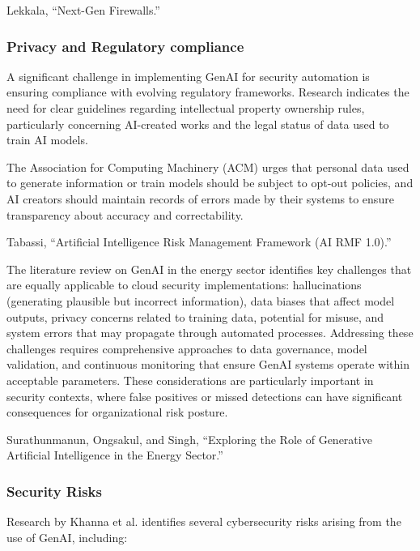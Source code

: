 Lekkala, “Next-Gen Firewalls.”


\subsubsection{Privacy and Regulatory compliance} %
\label{sec:Privacy and Regulatory compliance}

A significant challenge in implementing GenAI for security automation is ensuring compliance with evolving regulatory frameworks. Research indicates the need for clear guidelines regarding intellectual property ownership rules, particularly concerning AI-created works and the legal status of data used to train AI models.

The Association for Computing Machinery (ACM) urges that personal data used to generate information or train models should be subject to opt-out policies, and AI creators should maintain records of errors made by their systems to ensure transparency about accuracy and correctability.

Tabassi, “Artificial Intelligence Risk Management Framework (AI RMF 1.0).”

The literature review on GenAI in the energy sector identifies key challenges that are equally applicable to cloud security implementations: hallucinations (generating plausible but incorrect information), data biases that affect model outputs, privacy concerns related to training data, potential for misuse, and system errors that may propagate through automated processes.
Addressing these challenges requires comprehensive approaches to data governance, model validation, and continuous monitoring that ensure GenAI systems operate within acceptable parameters. These considerations are particularly important in security contexts, where false positives or missed detections can have significant consequences for organizational risk posture.

Surathunmanun, Ongsakul, and Singh, “Exploring the Role of Generative Artificial Intelligence in the Energy Sector.”


\subsubsection{Security Risks} %
\label{sec:Security Risks}

Research by Khanna et al. identifies several cybersecurity risks arising from the use of GenAI, including:

